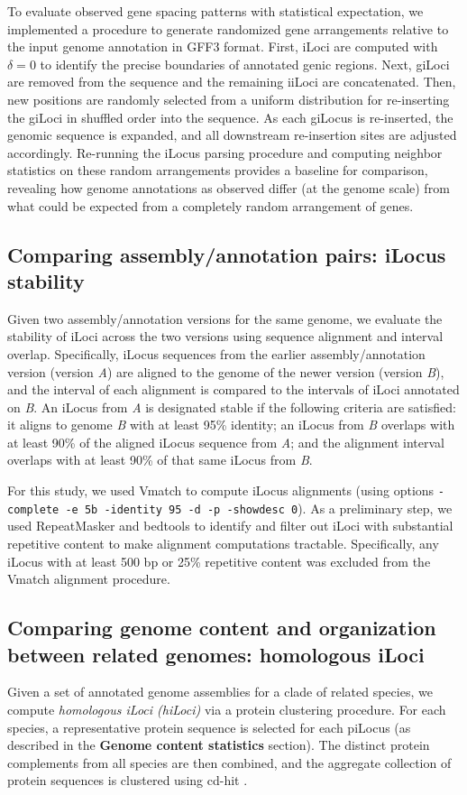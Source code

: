 To evaluate observed gene spacing patterns with statistical expectation, we implemented a procedure to generate randomized gene arrangements relative to the input genome annotation in GFF3 format.
First, iLoci are computed with $\delta=0$ to identify the precise boundaries of annotated genic regions.
Next, giLoci are removed from the sequence and the remaining iiLoci are concatenated.
Then, new positions are randomly selected from a uniform distribution for re-inserting the giLoci in shuffled order into the sequence.
As each giLocus is re-inserted, the genomic sequence is expanded, and all downstream re-insertion sites are adjusted accordingly.
Re-running the iLocus parsing procedure and computing neighbor statistics on these random arrangements provides a baseline for comparison, revealing how genome annotations as observed differ (at the genome scale) from what could be expected from a completely random arrangement of genes.


\subsection{Comparing assembly/annotation pairs: iLocus stability}
Given two assembly/annotation versions for the same genome, we evaluate the stability of iLoci across the two versions using sequence alignment and interval overlap.
Specifically, iLocus sequences from the earlier assembly/annotation version (version \textit{A}) are aligned to the genome of the newer version (version \textit{B}), and the interval of each alignment is compared to the intervals of iLoci annotated on \textit{B}.
An iLocus from \textit{A} is designated stable if the following criteria are satisfied: it aligns to genome \textit{B} with at least 95\% identity; an iLocus from \textit{B} overlaps with at least 90\% of the aligned iLocus sequence from \textit{A}; and the alignment interval overlaps with at least 90\% of that same iLocus from \textit{B}.

For this study, we used Vmatch \cite{Vmatch} to compute iLocus alignments (using options \texttt{-complete -e 5b -identity 95 -d -p -showdesc 0}).
As a preliminary step, we used RepeatMasker \cite{RepeatMasker,RepBase} and bedtools \cite{bedtools} to identify and filter out iLoci with substantial repetitive content to make alignment computations tractable.
Specifically, any iLocus with at least 500 bp or 25\% repetitive content was excluded from the Vmatch alignment procedure.


\subsection{Comparing genome content and organization between related genomes: homologous iLoci}
Given a set of annotated genome assemblies for a clade of related species, we compute \textit{homologous iLoci (hiLoci)} via a protein clustering procedure.
For each species, a representative protein sequence is selected for each piLocus (as described in the \textbf{Genome content statistics} section).
The distinct protein complements from all species are then combined, and the aggregate collection of protein sequences is clustered using cd-hit \cite{cdhit}.


